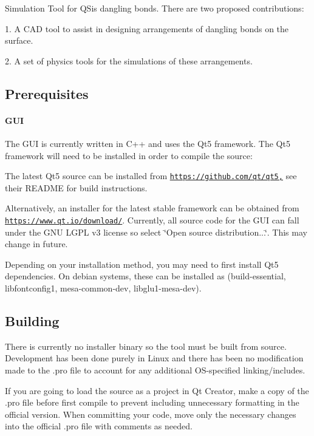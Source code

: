 Simulation Tool for Q\+Si\textquotesingle{}s dangling bonds. There are two proposed contributions\+: \begin{DoxyVerb}1. A CAD tool to assist in designing arrangements of dangling bonds on the surface.

2. A set of physics tools for the simulations of these arrangements.
\end{DoxyVerb}


\subsection*{Prerequisites}

\paragraph*{G\+UI}

The G\+UI is currently written in C++ and uses the Qt5 framework. The Qt5 framework will need to be installed in order to compile the source\+:


\begin{DoxyEnumerate}
\item The latest Qt5 source can be installed from \href{https://github.com/qt/qt5,}{\tt https\+://github.\+com/qt/qt5,} see their R\+E\+A\+D\+ME for build instructions.
\item Alternatively, an installer for the latest stable framework can be obtained from \href{https://www.qt.io/download/}{\tt https\+://www.\+qt.\+io/download/}. Currently, all source code for the G\+UI can fall under the G\+NU L\+G\+PL v3 license so select \char`\"{}\+Open source distribution...\char`\"{}. This may change in future.
\end{DoxyEnumerate}

Depending on your installation method, you may need to first install Qt5 dependencies. On debian systems, these can be installed as (build-\/essential, libfontconfig1, mesa-\/common-\/dev, libglu1-\/mesa-\/dev).

\subsection*{Building}

There is currently no installer binary so the tool must be built from source. Development has been done purely in Linux and there has been no modification made to the .pro file to account for any additional O\+S-\/specified linking/includes.

If you are going to load the source as a project in Qt Creator, make a copy of the .pro file before first compile to prevent including unnecessary formatting in the official version. When committing your code, move only the necessary changes into the official .pro file with comments as needed.

